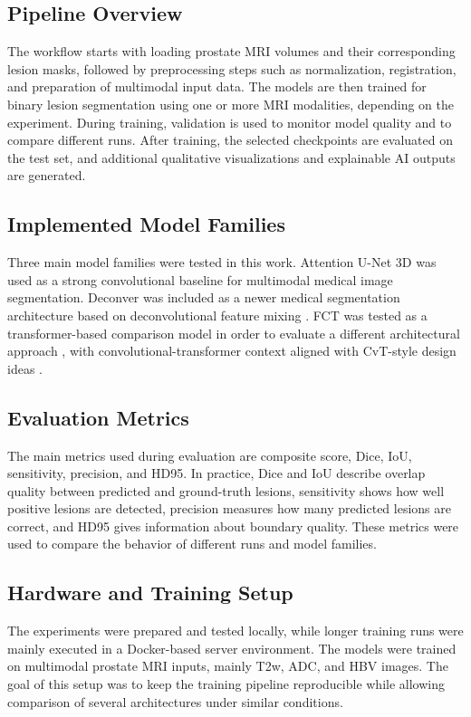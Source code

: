 \documentclass[11pt,a4paper]{article}
\begin{document}
\subsection{Pipeline Overview}

The workflow starts with loading prostate MRI volumes and their corresponding lesion masks, followed by preprocessing steps such as normalization, registration, and preparation of multimodal input data. The models are then trained for binary lesion segmentation using one or more MRI modalities, depending on the experiment. During training, validation is used to monitor model quality and to compare different runs. After training, the selected checkpoints are evaluated on the test set, and additional qualitative visualizations and explainable AI outputs are generated.

\subsection{Implemented Model Families}

Three main model families were tested in this work. Attention U-Net 3D was used as a strong convolutional baseline for multimodal medical image segmentation. Deconver was included as a newer medical segmentation architecture based on deconvolutional feature mixing \cite{deconver}. FCT was tested as a transformer-based comparison model in order to evaluate a different architectural approach \cite{fct}, with convolutional-transformer context aligned with CvT-style design ideas \cite{cvt}.

\subsection{Evaluation Metrics}

The main metrics used during evaluation are composite score, Dice, IoU, sensitivity, precision, and HD95. In practice, Dice and IoU describe overlap quality between predicted and ground-truth lesions, sensitivity shows how well positive lesions are detected, precision measures how many predicted lesions are correct, and HD95 gives information about boundary quality. These metrics were used to compare the behavior of different runs and model families.

\subsection{Hardware and Training Setup}

The experiments were prepared and tested locally, while longer training runs were mainly executed in a Docker-based server environment. The models were trained on multimodal prostate MRI inputs, mainly T2w, ADC, and HBV images. The goal of this setup was to keep the training pipeline reproducible while allowing comparison of several architectures under similar conditions.
\end{document}

